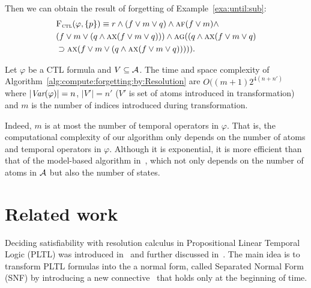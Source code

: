 \documentclass{article}
\begin{document}
Then we can obtain the result of forgetting of Example~\ref{exa:until:sub}:
\begin{align*}
& {\textsc{F}_{\textsc{ctl}}}(\varphi, \{p\}) \equiv r\wedge (f\vee m \vee q)  \wedge  \textsc{a}\textsc{f}(f \vee m) \wedge\\
& (f\vee m \vee (q\wedge \textsc{a}\textsc{x}(f\vee m\vee q)))  \wedge \textsc{a}\textsc{g}((q\wedge \textsc{a}\textsc{x}(f\vee m\vee q)\\
& \supset \textsc{a}\textsc{x}(f\vee m \vee (q\wedge \textsc{a}\textsc{x}(f\vee m\vee q))))).
\end{align*}


\begin{proposition}\label{pro:complexity}
Let $\varphi$ be a CTL formula and $V \subseteq {\cal A}$.
The time and space complexity of Algorithm~\ref{alg:compute:forgetting:by:Resolution} are $O((m+1)2^{4(n+n')}$ where $|\textit{Var}(\varphi)|=n$, $|V'|=n'$ ($V'$ is set of atoms introduced in transformation) and $m$ is the number of indices introduced during transformation.
\end{proposition}

Indeed, $m$ is at most the number of  temporal  operators in $\varphi$.
That is, the computational complexity of our algorithm only depends on the number of atoms and temporal operators in $\varphi$.
Although it is exponential, it is more efficient than that of the model-based algorithm in~\cite{renyansfirstpaper}, which not only depends on the number of atoms in ${\cal A}$ but also the number of states.

\section{Related work}
Deciding satisfiability with resolution calculus in Propositional Linear Temporal Logic (PLTL) was introduced in~\cite{fisher1991resolution} and further discussed in~\cite{fisher1997normal,fisher2001clausal}. The main idea is to transform PLTL formulas into the a normal form, called Separated Normal Form (SNF) by introducing a new connective \start\ that holds only at the beginning of time.
\end{document}
